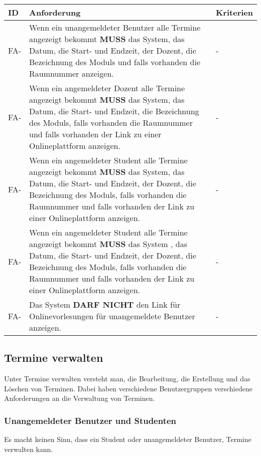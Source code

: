 \begin{tabular} {|p{}|p{11cm}|p{}|}
	\hline
	ID & Anforderung & Kriterien \\
	\hline
	FA-
	& Wenn ein unangemeldeter Benutzer alle Termine angezeigt bekommt \textbf{MUSS} das System, das Datum, die Start- und Endzeit, der Dozent, die Bezeichnung des Moduls und falls vorhanden die Raumnummer anzeigen. 
	& - \\
	\hline
	FA-
	& Wenn ein angemeldeter Dozent alle Termine angezeigt bekommt \textbf{MUSS} das System, das Datum, die Start- und Endzeit, die Bezeichnung des Moduls, falls vorhanden die Raumnummer und falls vorhanden der Link zu einer Onlineplattform anzeigen. 
	& - \\
	\hline
	FA-
	& Wenn ein angemeldeter Student alle Termine angezeigt bekommt \textbf{MUSS} das System, das Datum, die Start- und Endzeit, der Dozent, die Bezeichnung des Moduls, falls vorhanden die Raumnummer und falls vorhanden der Link zu einer Onlineplattform anzeigen. 
	& - \\
	\hline
	FA-
	& Wenn ein angemeldeter Student alle Termine angezeigt bekommt \textbf{MUSS} das System , das Datum, die Start- und Endzeit, der Dozent, die Bezeichnung des Moduls, falls vorhanden die Raumnummer und falls vorhanden der Link zu einer Onlineplattform anzeigen.
	& - \\
	\hline
	FA-
	& Das System \textbf{DARF NICHT} den Link für Onlinevorlesungen für unangemeldete Benutzer anzeigen. 
	& - \\
	\hline
\end{tabular}

\newpage

\subsection{Termine verwalten}
Unter Termine verwalten versteht man, die Bearbeitung, die Erstellung und das Löschen von Terminen. Dabei haben verschiedene Benutzergruppen verschiedene Anforderungen an die Verwaltung von Terminen.

\vspace{12pt}

\subsubsection{Unangemeldeter Benutzer und Studenten}
Es macht keinen Sinn, dass ein Student oder unangemeldeter Benutzer, Termine verwalten kann.

\vspace{12pt}

